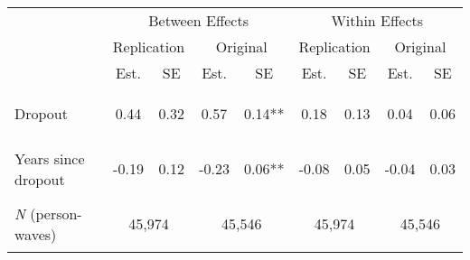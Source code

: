 \begin{center}
\begin{tabular}{lcccccccc}
\hline \noalign{\smallskip} & \multicolumn{4}{c}{Between Effects} & \multicolumn{4}{c}{Within Effects}\\
 & \multicolumn{2}{c}{Replication} & \multicolumn{2}{c}{Original} & \multicolumn{2}{c}{Replication} & \multicolumn{2}{c}{Original}\\
 & Est. & SE & Est. & SE & Est. & SE & Est. & SE\\
\noalign{\smallskip}\hline \noalign{\smallskip}Dropout & \begin{bf}0.44\end{bf} & \begin{bf}0.32\end{bf} & \begin{rm}0.57\end{rm} & \begin{rm}0.14**\end{rm} & \begin{bf}0.18\end{bf} & \begin{bf}0.13\end{bf} & \begin{rm}0.04\end{rm} & \begin{rm}0.06\end{rm}\\
Years since dropout & \begin{bf}-0.19\end{bf} & \begin{bf}0.12\end{bf} & \begin{rm}-0.23\end{rm} & \begin{rm}0.06**\end{rm} & \begin{bf}-0.08\end{bf} & \begin{bf}0.05\end{bf} & \begin{rm}-0.04\end{rm} & \begin{rm}0.03\end{rm}\\
\textit{N} (person-waves) & \multicolumn{2}{c}{\begin{bf}45,974\end{bf}} & \multicolumn{2}{c}{\begin{rm}45,546\end{rm}} & \multicolumn{2}{c}{\begin{bf}45,974\end{bf}} & \multicolumn{2}{c}{\begin{rm}45,546\end{rm}}\\

\end{tabular}
\end{center}
